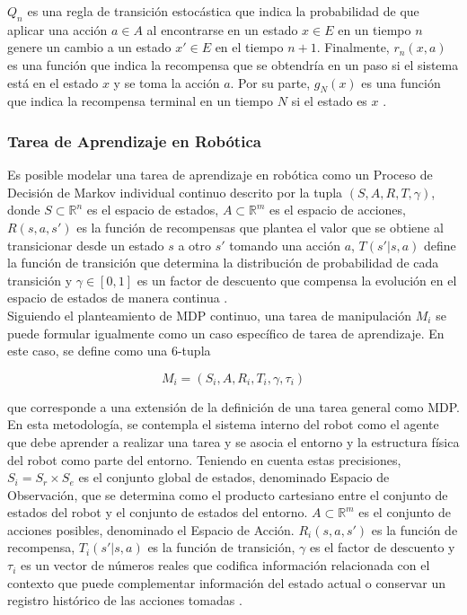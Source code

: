 $Q_n$ es una regla de transición estocástica que indica la probabilidad de que aplicar una acción $a\in A$ al encontrarse en un estado $x\in E$ en un tiempo $n$ genere un cambio a un estado $x' \in E$ en el tiempo $n+1$. Finalmente, $r_n(x,a)$ es una función que indica la recompensa que se obtendría en un paso si el sistema está en el estado $x$ y se toma la acción $a$. Por su parte, $g_N(x)$ es una función que indica la recompensa terminal en un tiempo $N$ si el estado es $x$ \parencite{bauerle2010markov}.\\

\subsubsection{Tarea de Aprendizaje en Robótica}

Es posible modelar una tarea de aprendizaje en robótica como un Proceso de Decisión de Markov individual continuo descrito por la tupla $(S,A,R,T,\gamma)$, donde $S\subset \mathbb{R}^n$ es el espacio de estados, $A\subset \mathbb{R}^m$ es el espacio de acciones, $R(s,a,s')$ es la función de recompensas que plantea el valor que se obtiene al transicionar desde un estado $s$ a otro $s'$ tomando una acción $a$, $T(s'|s,a)$ define la función de transición que determina la distribución de probabilidad de cada transición y $\gamma \in [0,1]$ es un factor de descuento que compensa la evolución en el espacio de estados de manera continua \parencite{kroemer2021review}.\\

Siguiendo el planteamiento de MDP continuo, una tarea de manipulación $M_i$ se puede formular igualmente como un caso específico de tarea de aprendizaje. En este caso, se define como una 6-tupla 

$$M_i = (S_i, A, R_i, T_i, \gamma, \tau_i)$$

que corresponde a una extensión de la definición de una tarea general como MDP. En esta metodología, se contempla el sistema interno del robot como el agente que debe aprender a realizar una tarea y se asocia el entorno y la estructura física del robot como parte del entorno. Teniendo en cuenta estas precisiones, $S_i = S_r \times S_e$ es el conjunto global de estados, denominado Espacio de Observación, que se determina como el producto cartesiano entre el conjunto de estados del robot y el conjunto de estados del entorno. $A \subset \mathbb{R}^m$ es el conjunto de acciones posibles, denominado el Espacio de Acción. $R_i(s,a,s')$ es la función de recompensa, $T_i(s'|s,a)$ es la función de transición, $\gamma$ es el factor de descuento y $\tau_i$ es un vector de números reales que codifica información relacionada con el contexto que puede complementar información del estado actual o conservar un registro histórico de las acciones tomadas \parencite{kroemer2021review}.\\

